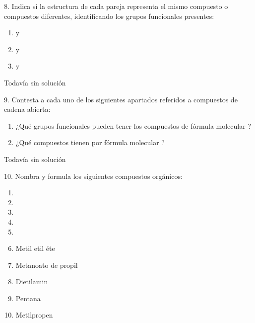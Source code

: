 \documentclass[twocolumn]{article}
\begin{document}
\begin{exercise}
  8. Indica si la estructura de cada pareja representa el mismo
  compuesto o compuestos diferentes, identificando los grupos
  funcionales presentes:
  \begin{enumerate}
    \item {} y 
    \item {} y 
    \item {} y 
  \end{enumerate}
\end{exercise}

\begin{solution}[print=false]
  Todavía sin solución
\end{solution}

\begin{exercise}
  9. Contesta a cada uno de los siguientes apartados referidos a
  compuestos de cadena abierta:
  \begin{enumerate}
    \item ¿Qué grupos funcionales pueden tener los compuestos de
    fórmula molecular ?
    \item ¿Qué compuestos tienen por fórmula molecular ?
  \end{enumerate}
\end{exercise}

\begin{solution}[print=false]
  Todavía sin solución
\end{solution}

\begin{exercise}
  10. Nombra y formula los siguientes compuestos orgánicos:
  \begin{enumerate}
    \item {}
    \item {}
    \item {}
    \item {}
    \item {}
    \item Metil etil éte
    \item Metanoato de propil
    \item Dietilamin
    \item Pentana
    \item Metilpropen
  \end{enumerate}
\end{exercise}
\end{document}
